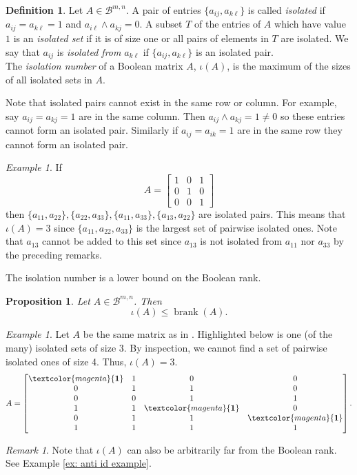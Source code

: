 \documentclass[11pt,letterpaper, reqno]{amsart}
\newtheorem{proposition}[theorem]{Proposition}
\theoremstyle{definition}
\newtheorem{definition}[theorem]{Definition}
\theoremstyle{remark}
\newtheorem{remark}[theorem]{Remark}
\newtheorem{example}[theorem]{Example}
\newcommand{\Bc}{\mathcal{B}}
\DeclareMathOperator{\brank}{brank}
\numberwithin{equation}{section}
\begin{document}
 
\begin{definition}\label{def: isolated}
Let $A\in \Bc^{m,n}$. A pair of entries $\{a_{ij},a_{k\ell}\}$ is called \textit{isolated} if  $a_{ij}=a_{k\ell}=1$ and $a_{i\ell}\wedge a_{kj}=0$.  A subset $T$ of the entries of $A$ which have value $1$ is an \textit{isolated set} if it is of size one or all pairs of elements in $T$ are isolated. We say that $a_{ij}$ is \textit{isolated from} $a_{k\ell}$ if $\{a_{ij},a_{k\ell}\}$ is an isolated pair.\\

\noindent The \textit{isolation number} of a Boolean matrix $A$, $\iota(A)$, is the maximum of the sizes of all isolated sets in $A$. 
\end{definition}

Note that isolated pairs cannot exist in the same row or column. For example, say $a_{ij}=a_{kj}=1$ are in the same column. Then $a_{ij}\wedge a_{kj}=1\neq 0$ so these entries cannot form an isolated pair. Similarly if $a_{ij}=a_{ik}=1$ are in the same row they cannot form an isolated pair. 

\begin{example}
    If 
        \[
        A = \begin{bmatrix} 1&0&1\\0&1&0\\0&0&1\end{bmatrix}
        \]
    then $\{a_{11},a_{22}\},\{a_{22},a_{33}\},\{a_{11},a_{33}\},\{a_{13},a_{22}\}$ are isolated pairs. This means that $\iota(A)=3$ since $\{a_{11},a_{22},a_{33}\}$ is the largest set of pairwise isolated ones. Note that $a_{13}$ cannot be added to this set since $a_{13}$ is not isolated from $a_{11}$ nor $a_{33}$ by the preceding remarks.  
\end{example}

The isolation number is a lower bound on the Boolean rank.

\begin{proposition}\cite[Prop.\,2]{DeSantis21}\label{prop: iso-brank}
    Let $A\in \Bc^{m,n}$. Then
    \[
    \iota(A) \leq \brank(A).
    \]
\end{proposition}

\begin{example}
Let $A$ be the same matrix as in . Highlighted below is one (of the many) isolated sets of size $3$. By inspection, we cannot find a set of pairwise isolated ones of size 4. Thus, $\iota(A)=3$.
\[
A=\begin{bmatrix}
\textcolor{magenta}{\bf 1}&1&0&0\\
0&1&1&0\\
0&0&1&1\\
1&1&\textcolor{magenta}{\bf 1}&0\\
0&1&1&\textcolor{magenta}{\bf 1}\\
1&1&1&1
\end{bmatrix}.
\]
\end{example}
\begin{remark}
Note that $\iota(A)$ can also be arbitrarily far from the Boolean rank. See Example \ref{ex: anti id example}.
\end{remark}
\end{document}
